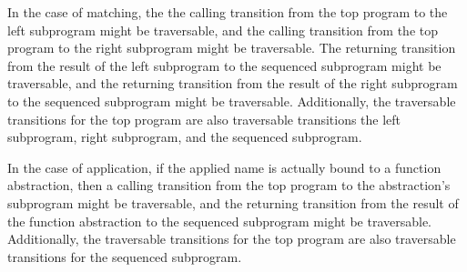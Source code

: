 \documentclass[10pt]{article}
\begin{document}
In the case of matching, the the calling transition from the top program to
the left subprogram might be traversable, and
the calling transition from the top program to the
right subprogram might be traversable.  The returning transition from the result of the
left subprogram to the sequenced subprogram might be traversable, and the returning
transition from the result of the right subprogram to the sequenced subprogram might be
traversable.  Additionally, the traversable transitions for the top program are also
traversable transitions the left subprogram, right subprogram, and the sequenced subprogram.   

In the case of application, if the applied name is actually bound to a function
abstraction, then a calling transition from the top program to the abstraction's subprogram
might be traversable, and the returning transition from the result of the function
abstraction to the sequenced subprogram might be traversable.
Additionally, the traversable transitions for the top program are also
traversable transitions for the sequenced subprogram. 
\end{document}
